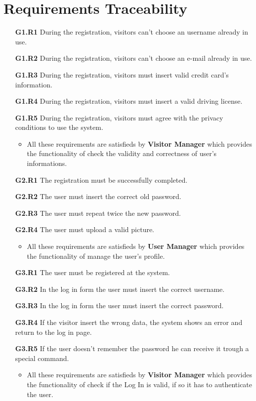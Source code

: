 \section{Requirements Traceability} \label{sec:req-trac}


\begin{itemize}
\item[\textbf{G1.R1}] During the registration, visitors can't choose an username already in use.
\item[\textbf{G1.R2}] During the registration, visitors can't choose an e-mail already in use.
\item[\textbf{G1.R3}] During the registration, visitors must insert valid credit card's information.
\item[\textbf{G1.R4}] During the registration, visitors must insert a valid driving license.
\item[\textbf{G1.R5}] During the registration, visitors must agree with the privacy conditions to use the system.
\begin{itemize}
\item All these requirements are satisfieds by \textbf{Visitor Manager} which provides the functionality of check the validity and correctness of user's informations.
\end{itemize}

\item[\textbf{G2.R1}] The registration must be successfully completed.
\item[\textbf{G2.R2}] The user must insert the correct old password.
\item[\textbf{G2.R3}] The user must repeat twice the new password.
\item[\textbf{G2.R4}] The user must upload a valid picture.
\begin{itemize}
\item All these requirements are satisfieds by \textbf{User Manager} which provides the functionality of manage the user's profile.
\end{itemize}

\item[\textbf{G3.R1}] The user must be registered at the system.
\item[\textbf{G3.R2}] In the log in form the user must insert the correct username.
\item[\textbf{G3.R3}] In the log in form the user must insert the correct password.
\item[\textbf{G3.R4}] If the visitor insert the wrong data, the system shows an error and return to the log in page.
\item[\textbf{G3.R5}] If the user doesn't remember the password he can receive it trough a special command.
\begin{itemize}
\item All these requirements are satisfieds by \textbf{Visitor Manager} which provides the functionality of check if the Log In is valid, if so it has to authenticate the user.
\end{itemize}


\end{itemize}
